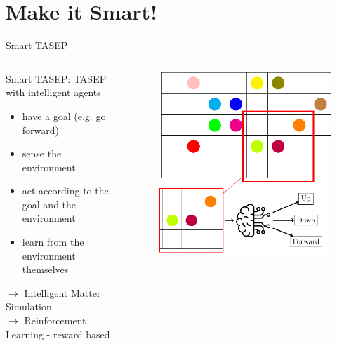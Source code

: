 \documentclass[10pt,xcolor=table, aspectratio=1610]{beamer}
\begin{document}
\section{Make it Smart!}
\begin{frame}{Smart TASEP}
    \begin{columns}
      \begin{block}{Smart TASEP: TASEP with intelligent agents}
      \begin{itemize}
        \item have a goal (e.g. go forward)
        \item sense the environment
        \item act according to the goal and the environment
        \item learn from the environment themselves
      \end{itemize}
      $\rightarrow$ Intelligent Matter Simulation \\
      $\rightarrow$ Reinforcement Learning - reward based
      \end{block}
      \begin{figure}
        \includegraphics[width=\textwidth]{img/out/agents.pdf}
      \end{figure}
    \end{columns}
\end{frame}
\end{document}
